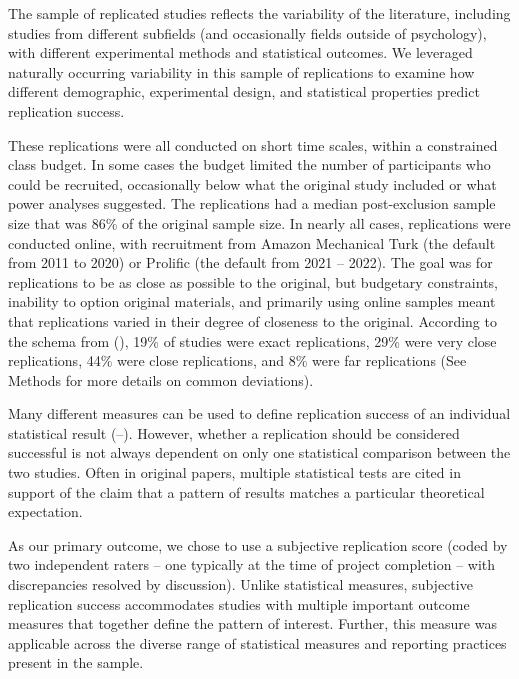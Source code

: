\documentclass[
  english,
  a4paper,
]{article}
\begin{document}
The sample of replicated studies reflects the variability of the literature, including studies from different subfields (and occasionally fields outside of psychology), with different experimental methods and statistical outcomes. We leveraged naturally occurring variability in this sample of replications to examine how different demographic, experimental design, and statistical properties predict replication success.

These replications were all conducted on short time scales, within a constrained class budget. In some cases the budget limited the number of participants who could be recruited, occasionally below what the original study included or what power analyses suggested. The replications had a median post-exclusion sample size that was 86\% of the original sample size. In nearly all cases, replications were conducted online, with recruitment from Amazon Mechanical Turk (the default from 2011 to 2020) or Prolific (the default from 2021 -- 2022). The goal was for replications to be as close as possible to the original, but budgetary constraints, inability to option original materials, and primarily using online samples meant that replications varied in their degree of closeness to the original. According to the schema from (), 19\% of studies were exact replications, 29\% were very close replications, 44\% were close replications, and 8\% were far replications (See Methods for more details on common deviations).

Many different measures can be used to define replication success of an individual statistical result (--). However, whether a replication should be considered successful is not always dependent on only one statistical comparison between the two studies. Often in original papers, multiple statistical tests are cited in support of the claim that a pattern of results matches a particular theoretical expectation.

As our primary outcome, we chose to use a subjective replication score (coded by two independent raters -- one typically at the time of project completion -- with discrepancies resolved by discussion). Unlike statistical measures, subjective replication success accommodates studies with multiple important outcome measures that together define the pattern of interest. Further, this measure was applicable across the diverse range of statistical measures and reporting practices present in the sample.
\end{document}
